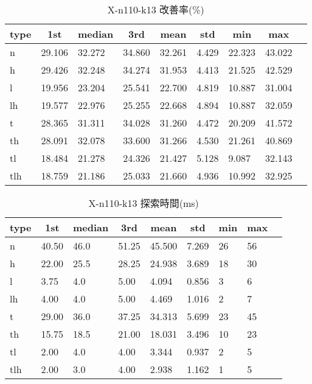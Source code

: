 \begin{table}[htbp]
    \centering
    \caption{X-n110-k13 改善率(\%)}
    \begin{tabular}{|l|l|l|l|l|l|l|l|l|}\hline
    \multicolumn{1}{|c|}{\textbf{type}}
    &\multicolumn{1}{|c|}{\textbf{1st}}
    &\multicolumn{1}{c|}{\textbf{median}}
    &\multicolumn{1}{c|}{\textbf{3rd}}
    &\multicolumn{1}{c|}{\textbf{mean}}
    &\multicolumn{1}{c|}{\textbf{std}}
    &\multicolumn{1}{c|}{\textbf{min}}
    &\multicolumn{1}{c|}{\textbf{max}}\\\hline
	n & 29.106 & 32.272 & 34.860 & 32.261 & 4.429 & 22.323 & 43.022\\\hline
	h & 29.426 & 32.248 & 34.274 & 31.953 & 4.413 & 21.525 & 42.529\\\hline
	l & 19.956 & 23.204 & 25.541 & 22.700 & 4.819 & 10.887 & 31.004\\\hline
	lh & 19.577 & 22.976 & 25.255 & 22.668 & 4.894 & 10.887 & 32.059\\\hline
	t & 28.365 & 31.311 & 34.028 & 31.260 & 4.472 & 20.209 & 41.572\\\hline
	th & 28.091 & 32.078 & 33.600 & 31.266 & 4.530 & 21.261 & 40.869\\\hline
	tl & 18.484 & 21.278 & 24.326 & 21.427 & 5.128 & 9.087 & 32.143\\\hline
	tlh & 18.759 & 21.186 & 25.033 & 21.660 & 4.936 & 10.992 & 32.925\\\hline
	\end{tabular}
\end{table}
\begin{table}[htbp]
    \centering
    \caption{X-n110-k13 探索時間(ms)}
    \begin{tabular}{|l|l|l|l|l|l|l|l|l|}\hline
    \multicolumn{1}{|c|}{\textbf{type}}
    &\multicolumn{1}{|c|}{\textbf{1st}}
    &\multicolumn{1}{c|}{\textbf{median}}
    &\multicolumn{1}{c|}{\textbf{3rd}}
    &\multicolumn{1}{c|}{\textbf{mean}}
    &\multicolumn{1}{c|}{\textbf{std}}
    &\multicolumn{1}{c|}{\textbf{min}}
    &\multicolumn{1}{c|}{\textbf{max}}\\\hline
	n & 40.50 & 46.0 & 51.25 & 45.500 & 7.269 & 26 & 56\\\hline
	h & 22.00 & 25.5 & 28.25 & 24.938 & 3.689 & 18 & 30\\\hline
	l & 3.75 & 4.0 & 5.00 & 4.094 & 0.856 & 3 & 6\\\hline
	lh & 4.00 & 4.0 & 5.00 & 4.469 & 1.016 & 2 & 7\\\hline
	t & 29.00 & 36.0 & 37.25 & 34.313 & 5.699 & 23 & 45\\\hline
	th & 15.75 & 18.5 & 21.00 & 18.031 & 3.496 & 10 & 23\\\hline
	tl & 2.00 & 4.0 & 4.00 & 3.344 & 0.937 & 2 & 5\\\hline
	tlh & 2.00 & 3.0 & 4.00 & 2.938 & 1.162 & 1 & 5\\\hline
	\end{tabular}
\end{table}
